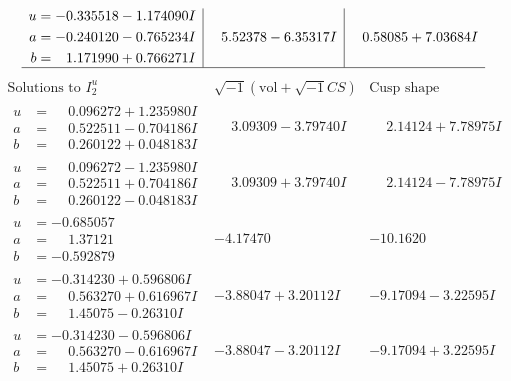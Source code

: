 \documentclass[1p]{elsarticle_modified}
\theoremstyle{definition}
\newcommand{\I}{\sqrt{-1}}
\begin{document}
$$\begin{array}{c|c|c}
\begin{aligned}
u &= -0.335518 - 1.174090 I \\
a &= -0.240120 - 0.765234 I \\
b &= \phantom{-}1.171990 + 0.766271 I\end{aligned}
 & \phantom{-}5.52378 - 6.35317 I & \phantom{-}0.58085 + 7.03684 I\\
 \hline 
 \end{array}$$\newpage$$\begin{array}{c|c|c}  
\text{Solutions to }I^u_{2}& \I (\text{vol} + \sqrt{-1}CS) & \text{Cusp shape}\\
 \hline 
\begin{aligned}
u &= \phantom{-}0.096272 + 1.235980 I \\
a &= \phantom{-}0.522511 - 0.704186 I \\
b &= \phantom{-}0.260122 + 0.048183 I\end{aligned}
 & \phantom{-}3.09309 - 3.79740 I & \phantom{-}2.14124 + 7.78975 I \\ \hline\begin{aligned}
u &= \phantom{-}0.096272 - 1.235980 I \\
a &= \phantom{-}0.522511 + 0.704186 I \\
b &= \phantom{-}0.260122 - 0.048183 I\end{aligned}
 & \phantom{-}3.09309 + 3.79740 I & \phantom{-}2.14124 - 7.78975 I \\ \hline\begin{aligned}
u &= -0.685057\phantom{ +0.000000I} \\
a &= \phantom{-}1.37121\phantom{ +0.000000I} \\
b &= -0.592879\phantom{ +0.000000I}\end{aligned}
 & -4.17470\phantom{ +0.000000I} & -10.1620\phantom{ +0.000000I} \\ \hline\begin{aligned}
u &= -0.314230 + 0.596806 I \\
a &= \phantom{-}0.563270 + 0.616967 I \\
b &= \phantom{-}1.45075 - 0.26310 I\end{aligned}
 & -3.88047 + 3.20112 I & -9.17094 - 3.22595 I \\ \hline\begin{aligned}
u &= -0.314230 - 0.596806 I \\
a &= \phantom{-}0.563270 - 0.616967 I \\
b &= \phantom{-}1.45075 + 0.26310 I\end{aligned}
 & -3.88047 - 3.20112 I & -9.17094 + 3.22595 I \\ \hline\begin{aligned}

\end{aligned}
\end{array}$$
\end{document}

